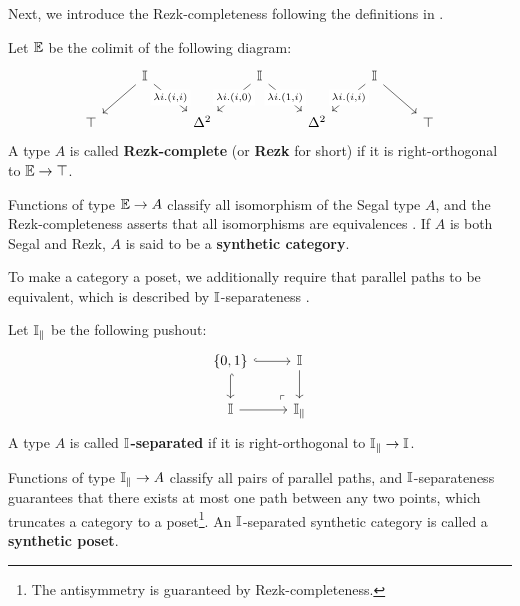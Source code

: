 Next, we introduce the Rezk-completeness following the definitions in \cite{buchholtz_synthetic_2022,sterling_domains_2025}.
\begin{definition}
    Let $\mathbb{E}$ be the colimit of the following diagram:
    \[\begin{tikzcd}
        & \I && \I && \I \\
        \top && {\Delta^2} && {\Delta^2} && \top
        \arrow[from=1-2, to=2-1]
        \arrow["{\lambda i.(i,i)}"{description}, from=1-2, to=2-3]
        \arrow["{\lambda i.(i,0)}"{description}, from=1-4, to=2-3]
        \arrow["{\lambda i.(1,i)}"{description}, from=1-4, to=2-5]
        \arrow["{\lambda i.(i,i)}"{description}, from=1-6, to=2-5]
        \arrow[from=1-6, to=2-7]
    \end{tikzcd}\]
    A type $A$ is called \textbf{Rezk-complete} (or \textbf{Rezk} for short) if it is right-orthogonal to $\mathbb{E}\to\top$.
\end{definition}
Functions of type $\mathbb{E}\to A$ classify all isomorphism of the Segal type $A$, and the Rezk-completeness asserts that all isomorphisms are equivalences \cite{buchholtz_synthetic_2022}. If $A$ is both Segal and Rezk, $A$ is said to be a \textbf{synthetic category}.

To make a category a poset, we additionally require that parallel paths to be equivalent, which is described by $\mathbb{I}$-separateness \cite{sterling_domains_2025}.
\begin{definition}
    Let $\mathbb{I}_\parallel$ be the following pushout:
    \[\begin{tikzcd}
        {\set{0,1}} & \I \\
        \I & {\I_\parallel}
        \arrow[hook, from=1-1, to=1-2]
        \arrow[hook, from=1-1, to=2-1]
        \arrow[from=1-2, to=2-2]
        \arrow[from=2-1, to=2-2]
        \arrow["\lrcorner"{anchor=center, pos=0.125, rotate=180}, draw=none, from=2-2, to=1-1]
    \end{tikzcd}\]
    A type $A$ is called \textbf{$\mathbb{I}$-separated} if it is right-orthogonal to $\mathbb{I}_\parallel\to\mathbb{I}$.
\end{definition}
Functions of type $\mathbb{I}_\parallel\to A$ classify all pairs of parallel paths, and $\mathbb{I}$-separateness guarantees that there exists at most one path between any two points, which truncates a category to a poset\footnote{The antisymmetry is guaranteed by Rezk-completeness.}. An $\mathbb{I}$-separated synthetic category is called a \textbf{synthetic poset}.

